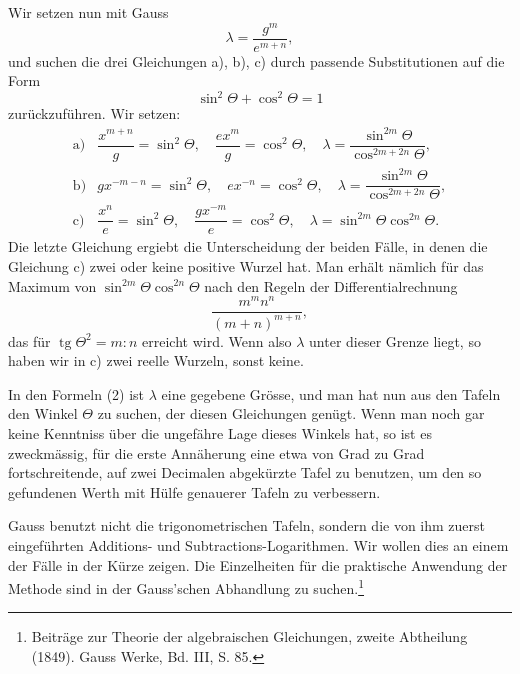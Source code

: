 \documentclass[11pt]{article}
\providecommand{\tg}{\operatorname{tg}}
\begin{document}
Wir setzen nun mit Gauss
\[
        \lambda=\frac{g^m}{e^{m+n}},
\]
und suchen die drei Gleichungen a), b), c) durch passende Substitutionen auf die Form
\[
        \sin^2\Theta+\cos^2\Theta=1
\]
zurückzuführen. Wir setzen:
\begin{equation}
\begin{array}{ll}
\mathrm{a)}&
\dfrac{x^{m+n}}g=\sin^2\Theta,\quad
\dfrac{ex^m}{g}=\cos^2\Theta,\quad
\lambda=\dfrac{\sin^{2m}\Theta}{\cos^{2m+2n}\Theta},\\[1.0em]
\mathrm{b)}&
gx^{-m-n}=\sin^2\Theta,\quad
ex^{-n}=\cos^2\Theta,\quad
\lambda=\dfrac{\sin^{2m}\Theta}{\cos^{2m+2n}\Theta},\\[1.0em]
\mathrm{c)}&
\dfrac{x^n}{e}=\sin^2\Theta,\quad
\dfrac{gx^{-m}}{e}=\cos^2\Theta,\quad
\lambda=\sin^{2m}\Theta\cos^{2n}\Theta.
\end{array}
\tag{2}
\end{equation}
Die letzte Gleichung ergiebt die Unterscheidung der beiden Fälle, in denen die Gleichung c) zwei oder keine positive Wurzel hat. Man erhält nämlich für das Maximum von $\sin^{2m}\Theta\cos^{2n}\Theta$ nach den Regeln der Differentialrechnung
\[
        \frac{m^mn^n}{(m+n)^{m+n}},
\]
das für $\tg\Theta^2=m:n$ erreicht wird. Wenn also $\lambda$ unter dieser Grenze liegt, so haben wir in c) zwei reelle Wurzeln, sonst keine.

In den Formeln (2) ist $\lambda$ eine gegebene Grösse, und man hat nun aus den Tafeln den Winkel $\Theta$ zu suchen, der diesen Gleichungen genügt. Wenn man noch gar keine Kenntniss über die ungefähre Lage dieses Winkels hat, so ist es zweckmässig, für die erste Annäherung eine etwa von Grad zu Grad fortschreitende, auf zwei Decimalen abgekürzte Tafel zu benutzen, um den so gefundenen Werth mit Hülfe genauerer Tafeln zu verbessern.

Gauss benutzt nicht die trigonometrischen Tafeln, sondern die von ihm zuerst eingeführten Additions- und Subtractions-Logarithmen. Wir wollen dies an einem der Fälle in der Kürze zeigen. Die Einzelheiten für die praktische Anwendung der Methode sind in der Gauss'schen Abhandlung zu suchen.\footnote{Beiträge zur Theorie der algebraischen Gleichungen, zweite Abtheilung (1849). Gauss Werke, Bd. III, S. 85.}
\end{document}
